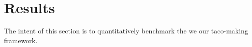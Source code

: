 
\section{Results}
\label{results}

The intent of this section is to quantitatively benchmark the we our taco-making framework.